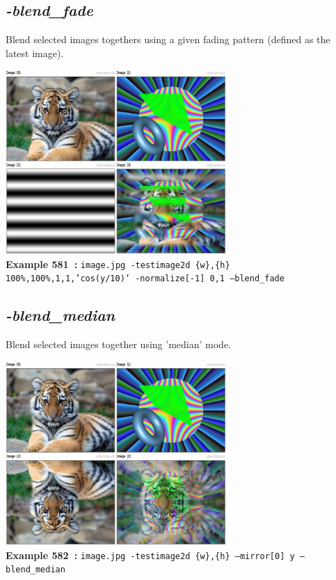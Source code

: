 \documentclass[a4paper,11pt,twoside]{book}
\begin{document}
\subsection{\emph{-blend\_fade} }\vspace*{-0.5em}
Blend selected images togethers using a given fading pattern (defined as the latest image).
\begin{center}\includegraphics[keepaspectratio=true,height=7cm,width=\textwidth]{img/gmic_def581.jpg}\\
{\footnotesize \textbf{Example 581~:} \texttt{image.jpg -testimage2d \{w\},\{h\} 100\%,100\%,1,1,'cos(y/10)' -normalize[-1] 0,1 --blend\_fade}}
\end{center}

\subsection{\emph{-blend\_median} }\vspace*{-0.5em}
Blend selected images together using 'median' mode.
\begin{center}\includegraphics[keepaspectratio=true,height=7cm,width=\textwidth]{img/gmic_def582.jpg}\\
{\footnotesize \textbf{Example 582~:} \texttt{image.jpg -testimage2d \{w\},\{h\} --mirror[0] y --blend\_median}}
\end{center}
\end{document}
